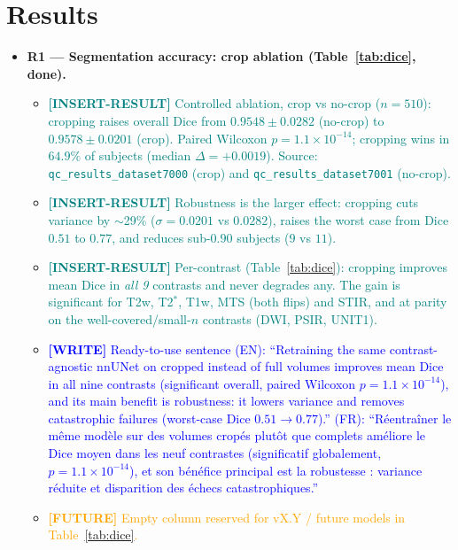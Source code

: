\documentclass[11pt]{article}
\newcommand{\WRITE}[1]{\textcolor{blue}{\textbf{[WRITE]} #1}}
\newcommand{\RESULT}[1]{\textcolor{teal}{\textbf{[INSERT-RESULT]} #1}}
\newcommand{\FUTURE}[1]{\textcolor{orange}{\textbf{[FUTURE]} #1}}
\begin{document}
\section{Results}\label{sec:results}
\begin{itemize}
  \item \textbf{R1 — Segmentation accuracy: crop ablation (Table~\ref{tab:dice}, done).}
    \begin{itemize}
      \item \RESULT{Controlled ablation, crop vs no-crop ($n=510$): cropping
            raises overall Dice from $0.9548\pm0.0282$ (no-crop) to
            $0.9578\pm0.0201$ (crop). Paired Wilcoxon $p=1.1\times10^{-14}$;
            cropping wins in $64.9\%$ of subjects (median $\Delta=+0.0019$).
            Source: \texttt{qc\_results\_dataset7000} (crop) and
            \texttt{qc\_results\_dataset7001} (no-crop).}
      \item \RESULT{Robustness is the larger effect: cropping cuts variance by
            $\sim$29\% ($\sigma=0.0201$ vs $0.0282$), raises the worst case from
            Dice $0.51$ to $0.77$, and reduces sub-$0.90$ subjects ($9$ vs $11$).}
      \item \RESULT{Per-contrast (Table~\ref{tab:dice}): cropping improves mean
            Dice in \emph{all 9} contrasts and never degrades any. The gain is
            significant for T2w, T2$^\ast$, T1w, MTS (both flips) and STIR, and at
            parity on the well-covered/small-$n$ contrasts (DWI, PSIR, UNIT1).}
      \item \WRITE{Ready-to-use sentence (EN): ``Retraining the same
            contrast-agnostic nnUNet on cropped instead of full volumes improves
            mean Dice in all nine contrasts (significant overall, paired Wilcoxon
            $p=1.1\times10^{-14}$), and its main benefit is robustness: it lowers
            variance and removes catastrophic failures (worst-case Dice $0.51
            \rightarrow 0.77$).'' (FR): ``R\'eentra\^iner le m\^eme mod\`ele sur
            des volumes crop\'es plut\^ot que complets am\'eliore le Dice moyen
            dans les neuf contrastes (significatif globalement, $p=1.1\times
            10^{-14}$), et son b\'en\'efice principal est la robustesse : variance
            r\'eduite et disparition des \'echecs catastrophiques.''}
      \item \FUTURE{Empty column reserved for vX.Y / future models in
            Table~\ref{tab:dice}.}
    \end{itemize}

\end{itemize}
\end{document}
